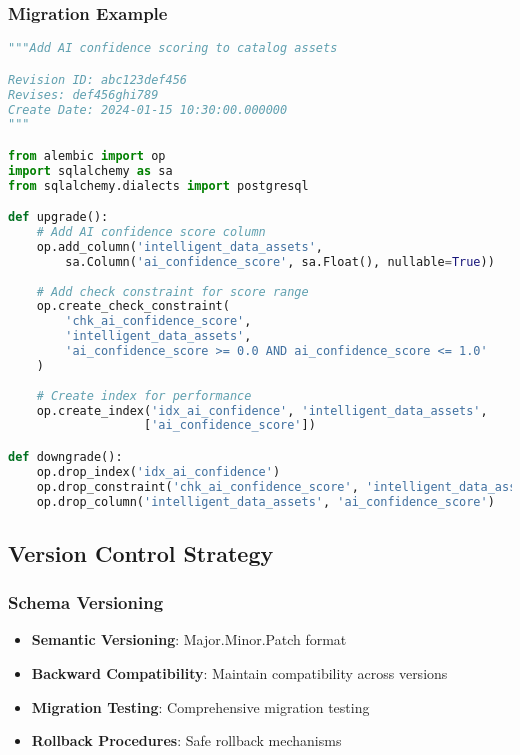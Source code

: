 \subsubsection{Migration Example}
\begin{lstlisting}[language=Python, caption=Alembic Migration Example]
"""Add AI confidence scoring to catalog assets

Revision ID: abc123def456
Revises: def456ghi789
Create Date: 2024-01-15 10:30:00.000000
"""

from alembic import op
import sqlalchemy as sa
from sqlalchemy.dialects import postgresql

def upgrade():
    # Add AI confidence score column
    op.add_column('intelligent_data_assets', 
        sa.Column('ai_confidence_score', sa.Float(), nullable=True))
    
    # Add check constraint for score range
    op.create_check_constraint(
        'chk_ai_confidence_score',
        'intelligent_data_assets',
        'ai_confidence_score >= 0.0 AND ai_confidence_score <= 1.0'
    )
    
    # Create index for performance
    op.create_index('idx_ai_confidence', 'intelligent_data_assets', 
                   ['ai_confidence_score'])

def downgrade():
    op.drop_index('idx_ai_confidence')
    op.drop_constraint('chk_ai_confidence_score', 'intelligent_data_assets')
    op.drop_column('intelligent_data_assets', 'ai_confidence_score')
\end{lstlisting}

\subsection{Version Control Strategy}

\subsubsection{Schema Versioning}
\begin{itemize}
    \item \textbf{Semantic Versioning}: Major.Minor.Patch format
    \item \textbf{Backward Compatibility}: Maintain compatibility across versions
    \item \textbf{Migration Testing}: Comprehensive migration testing
    \item \textbf{Rollback Procedures}: Safe rollback mechanisms
\end{itemize}


